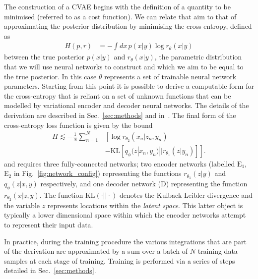 \documentclass[%
showpacs,
 amsmath,amssymb,
 aps,
 twocolumn,
 prl,
 reprint,
floatfix,
]{revtex4-1}
\begin{document}
%
%
The construction of a \ac{CVAE} begins with the definition of a quantity to be
minimised (referred to as a cost function). We can relate that aim to
that of approximating the posterior distribution by minimising the cross
entropy, defined as
%
\begin{align}\label{eq:cross_ent} 
H(p,r) &= -\int dx\, p(x|y) \log r_{\theta}(x|y) 
\end{align}
%
between the true posterior $p(x|y)$ and $r_{\theta}(x|y)$, the parametric
distribution that we will use neural networks to construct and which we aim to
be equal to the true posterior. In this case $\theta$ represents a set of
trainable neural network parameters. Starting from this point it is possible to
derive a computable form for the cross-entropy that is reliant on a set of
unknown functions that can be modelled by variational encoder
and decoder neural networks. The details of the derivation are described in
Sec.~\ref{sec:methods} and in~\cite{1904.06264}. The final form of the
cross-entropy loss function is given by the bound
%
\begin{align}\label{eq:cost3}
H \lesssim -\frac{1}{N}\sum_{n=1}^{N}&\left[\log
r_{\theta_{2}}(x_{n}|z_{n},y_{n})\right.\nonumber\\
&\left.-\text{KL}\left[q_{\phi}(z|x_{n},y_{n})||r_{\theta_{1}}(z|y_{n})\right]\right].
\end{align}
%
and requires three fully-connected networks; two encoder networks (labelled
$\textrm{E}_1$, $\textrm{E}_2$ in Fig.~\ref{fig:network_config}) representing
the functions $r_{\theta_{1}}(z|y)$ and $q_{\phi}(z|x,y)$ respectively, and one
decoder network (D) representing the function $r_{\theta_{2}}(x|z,y)$. The
function $\text{KL}(\cdot||\cdot)$ denotes the Kulback-Leibler divergence and
the variable $z$ represents locations within the \emph{latent space}.  This
latter object is typically a lower dimensional space within which the encoder
networks attempt to represent their input data. 

In practice, during the training procedure the various integrations that are
part of the derivation are approximated by a sum over a batch of $N$ training
data samples at each stage of training. Training is performed via a series of
steps detailed in Sec.~\ref{sec:methods}.
\end{document}
